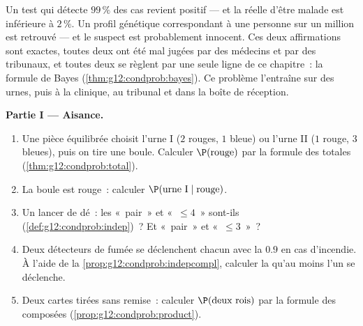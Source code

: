 \begin{problem}
\label{pb:g12:condprob:1}
Un test qui détecte $99\,\%$ des cas revient positif --- et la
 réelle d'être malade est inférieure à $2\,\%$. Un profil
génétique correspondant à une personne sur un million est retrouvé
--- et le suspect est probablement innocent. Ces deux affirmations
sont exactes, toutes deux ont été mal jugées par des médecins et par
des tribunaux, et toutes deux se règlent par une seule ligne de ce
chapitre~: la formule de Bayes (\cref{thm:g12:condprob:bayes}). Ce
problème l'entraîne sur des urnes, puis à la clinique, au tribunal
et dans la boîte de réception.

\medskip
\noindent\textbf{Partie I --- Aisance.}
\begin{enumerate}
  \item Une pièce équilibrée choisit l'urne I ($2$ rouges, $1$
        bleue) ou l'urne II ($1$ rouge, $3$ bleues), puis on tire
        une boule. Calculer $\P(\text{rouge})$ par la formule des
         totales (\cref{thm:g12:condprob:total}).
  \item La boule est rouge~: calculer
        $\P(\text{urne I} \mid \text{rouge})$.
  \item Un lancer de dé~: les  «~pair~» et
        «~$\leq 4$~» sont-ils 
        (\cref{def:g12:condprob:indep})~? Et «~pair~» et
        «~$\leq 3$~»~?
  \item Deux détecteurs de fumée  se déclenchent chacun
        avec la  $0.9$ en cas d'incendie. À l'aide de la
        \cref{prop:g12:condprob:indepcompl}, calculer la
         qu'au moins l'un se déclenche.
  \item Deux cartes tirées sans remise~: calculer
        $\P(\text{deux rois})$ par la formule des 
        composées (\cref{prop:g12:condprob:product}).
\end{enumerate}


\end{problem}

